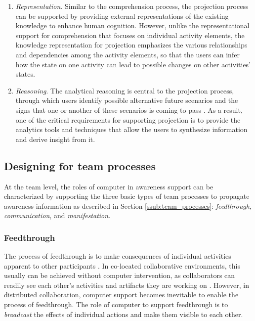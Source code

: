 \begin{enumerate}
	\item \emph{Representation}. Similar to the comprehension process, the projection process can be supported by providing external representations of the existing knowledge to enhance human cognition. However, unlike the representational support for comprehension that focuses on individual activity elements, the knowledge representation for projection emphasizes the various relationships and dependencies among the activity elements, so that the users can infer how the state on one activity can lead to possible changes on other activities' states.
	\item \emph{Reasoning}. The analytical reasoning is central to the projection process, through which users identify possible alternative future scenarios and the signs that one or another of these scenarios is coming to pass \cite{Thomas2006}. As a result, one of the critical requirements for supporting projection is to provide the analytics tools and techniques that allow the users to synthesize information and derive insight from it.
\end{enumerate}


\subsection{Designing for team processes} %
\label{sub:designing_for_the_team}
At the team level, the roles of computer in awareness support can be characterized by supporting the three basic types of team processes to propagate awareness information as described in Section \ref{ssub:team_processes}: \emph{feedthrough}, \emph{communication}, and \emph{manifestation}.

\subsubsection*{Feedthrough} %
\label{ssub:feedthrough}
The process of feedthrough is to make consequences of individual activities apparent to other participants \cite{dourish1992awareness}. In co-located collaborative environments, this usually can be achieved without computer intervention, as collaborators can readily see each other's activities and artifacts they are working on \cite{schmidt2002a}. However, in distributed collaboration, computer support becomes inevitable to enable the process of feedthrough. The role of computer to support feedthrough is to \emph{broadcast} the effects of individual actions and make them visible to each other.
